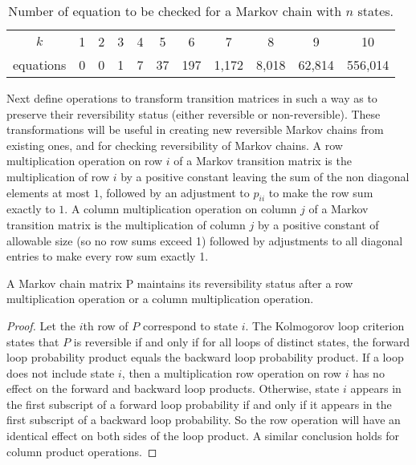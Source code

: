 \documentclass[12pt]{article}
\begin{document}
\begin{table}
    \centering
    \begin{tabular}{ccccccccccc}
      $k$ & 1 & 2 & 3 & 4 & 5 & 6 & 7 & 8 & 9 & 10 \\
      equations     & 0 & 0 & 1 & 7 & 37 & 197 & 1{,}172 & 8{,}018 & 62{,}814 & 556{,}014
    \end{tabular}
    \caption{Number of equation to be checked for a Markov chain with \(
    n \) states.}%
    \label{tab:reversiblemarkovchains:loopeqns}
\end{table}

Next define operations to transform transition matrices in such a way as
to preserve their reversibility status (either reversible or
non-reversible).  These transformations will be useful in creating new
reversible Markov chains from existing ones, and for checking
reversibility of Markov chains. A row multiplication operation on row \(
i \) of a Markov transition matrix is the multiplication of row \( i \)
by a positive constant leaving the sum of the non diagonal elements at
most \( 1 \), followed by an adjustment to \( p_{ii} \) to make the row
sum exactly to \( 1 \). A column multiplication operation on column \( j
\) of a Markov transition matrix is the multiplication of column \( j \)
by a positive constant of allowable size (so no row sums exceed 1)
followed by adjustments to all diagonal entries to make every row sum
exactly 1.

\begin{lemma}
    A Markov chain matrix P maintains its reversibility status after a
    row multiplication operation or a column multiplication operation.
\end{lemma}

\begin{proof}
    Let the \( i \)th row of \( P \) correspond to state \( i \).  The
    Kolmogorov loop criterion states that \( P \) is reversible if and
    only if for all loops of distinct states, the forward loop
    probability product equals the backward loop probability product.
    If a loop does not include state \( i \), then a multiplication row
    operation on row \( i \) has no effect on the forward and backward
    loop products.  Otherwise, state \( i \) appears in the first
    subscript of a forward loop probability if and only if it appears in
    the first subscript of a backward loop probability.  So the row
    operation will have an identical effect on both sides of the loop
    product.  A similar conclusion holds for column product operations.
\end{proof}
\end{document}

